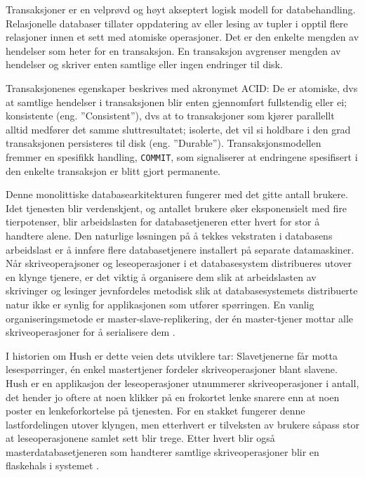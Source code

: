 Transaksjoner er en velprøvd og høyt akseptert logisk modell for databehandling. Relasjonelle databaser tillater oppdatering av eller lesing av tupler i opptil flere relasjoner innen et sett med atomiske operasjoner. Det er den enkelte mengden av hendelser som heter for en transaksjon. En transaksjon avgrenser mengden av hendelser og skriver enten samtlige eller ingen endringer til disk.

Transaksjonenes egenskaper beskrives med akronymet ACID: De er atomiske, dvs at samtlige hendelser i transaksjonen blir enten gjennomført fullstendig eller ei; konsistente (eng. ''Consistent''), dvs at to transaksjoner som kjører parallellt alltid medfører det samme sluttresultatet; isolerte, det vil si holdbare i den grad transaksjonen persisteres til disk (eng. ''Durable''). Transaksjonsmodellen fremmer en spesifikk handling, \texttt{COMMIT}, som signaliserer at endringene spesifisert i den enkelte transaksjon er blitt gjort permanente.

Denne monolittiske databasearkitekturen fungerer med det gitte antall brukere. Idet tjenesten blir verdenskjent, og antallet brukere øker eksponensielt med fire tierpotenser, blir arbeidslasten for databasetjeneren etter hvert for stor å handtere alene. Den naturlige løsningen på å tekkes vekstraten i databasens arbeidslast er å innføre flere databasetjenere installert på separate datamaskiner. Når skriveoperajsoner og leseoperasjoner i et databasesystem distribueres utover en klynge tjenere, er det viktig å organisere dem slik at arbeidslasten av skrivinger og lesinger jevnfordeles metodisk slik at databasesystemets distribuerte natur ikke er synlig for applikasjonen som utfører spørringen. En vanlig organiseringsmetode er master-slave-replikering, der én master-tjener mottar alle skriveoperasjoner for å serialisere dem \citep{george2011}.

I historien om Hush er dette veien dets utviklere tar: Slavetjenerne får motta lesespørringer, én enkel mastertjener fordeler skriveoperasjoner blant slavene. Hush er en applikasjon der leseoperasjoner utnummerer skriveoperasjoner i antall, det hender jo oftere at noen klikker på en frokortet lenke snarere enn at noen poster en lenkeforkortelse på tjenesten. For en stakket fungerer denne lastfordelingen utover klyngen, men etterhvert er tilveksten av brukere såpass stor at leseoperasjonene samlet sett blir trege. Etter hvert blir også masterdatabasetjeneren som handterer samtlige skriveoperasjoner blir en flaskehals i systemet \citep{george2011}.

